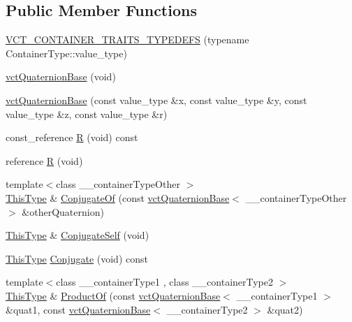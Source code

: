 \subsection*{Public Member Functions}
\begin{DoxyCompactItemize}
\item 
\hyperlink{classvct_quaternion_base_a6d50f34b12456a9ddabffcfe1e7163fa}{V\+C\+T\+\_\+\+C\+O\+N\+T\+A\+I\+N\+E\+R\+\_\+\+T\+R\+A\+I\+T\+S\+\_\+\+T\+Y\+P\+E\+D\+E\+F\+S} (typename Container\+Type\+::value\+\_\+type)
\item 
\hyperlink{classvct_quaternion_base_aa12f1dbce4f6951b7f5dbf152ab36451}{vct\+Quaternion\+Base} (void)
\item 
\hyperlink{classvct_quaternion_base_a74b7ff30dbf7795327422e6ad84dd3be}{vct\+Quaternion\+Base} (const value\+\_\+type \&x, const value\+\_\+type \&y, const value\+\_\+type \&z, const value\+\_\+type \&r)
\item 
const\+\_\+reference \hyperlink{classvct_quaternion_base_a5442f4bf5bb477002a83cfab0fe9a22d}{R} (void) const 
\item 
reference \hyperlink{classvct_quaternion_base_ae6bd16f152498430ca36ba19b816827e}{R} (void)
\item 
{\footnotesize template$<$class \+\_\+\+\_\+container\+Type\+Other $>$ }\\\hyperlink{classvct_quaternion_base_af28efdc38acf89acb7a67afada11408c}{This\+Type} \& \hyperlink{classvct_quaternion_base_ab9b4820ec33d504f116391dadd89ee55}{Conjugate\+Of} (const \hyperlink{classvct_quaternion_base}{vct\+Quaternion\+Base}$<$ \+\_\+\+\_\+container\+Type\+Other $>$ \&other\+Quaternion)
\item 
\hyperlink{classvct_quaternion_base_af28efdc38acf89acb7a67afada11408c}{This\+Type} \& \hyperlink{classvct_quaternion_base_a9090e2ae7e74eeb0cb980ba68f4e25d1}{Conjugate\+Self} (void)
\item 
\hyperlink{classvct_quaternion_base_af28efdc38acf89acb7a67afada11408c}{This\+Type} \hyperlink{classvct_quaternion_base_a5cb5a8f47aedbdb9a7dc690b42ee8023}{Conjugate} (void) const 
\item 
{\footnotesize template$<$class \+\_\+\+\_\+container\+Type1 , class \+\_\+\+\_\+container\+Type2 $>$ }\\\hyperlink{classvct_quaternion_base_af28efdc38acf89acb7a67afada11408c}{This\+Type} \& \hyperlink{classvct_quaternion_base_a00862717f38d8070a59e5ac3566332d3}{Product\+Of} (const \hyperlink{classvct_quaternion_base}{vct\+Quaternion\+Base}$<$ \+\_\+\+\_\+container\+Type1 $>$ \&quat1, const \hyperlink{classvct_quaternion_base}{vct\+Quaternion\+Base}$<$ \+\_\+\+\_\+container\+Type2 $>$ \&quat2)

\end{DoxyCompactItemize}
